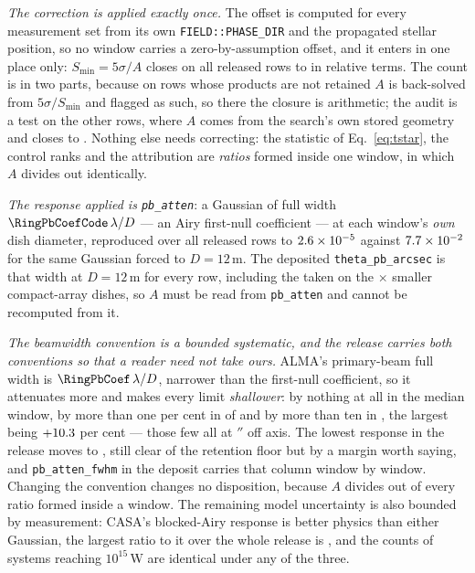 \emph{The correction is applied exactly once.} The offset is computed for
every measurement set from its own \texttt{FIELD::PHASE\_DIR} and the
propagated stellar position, so no window carries a zero-by-assumption
offset, and it enters in one place only: $S_{\min}=5\sigma/A$ closes on all
\PbSminClosed{} released rows to \PbSminWorstRes{} in relative terms. The
count is in two parts, because on \PbSminTaut{} rows whose products are not
retained $A$ is back-solved from $5\sigma/S_{\min}$ and flagged as such, so
there the closure is arithmetic; the audit is a test on the other
\PbSminIndep{} rows, where $A$ comes from the search's own stored geometry and
closes to \PbSminIndepRes. Nothing else needs correcting: the statistic of
Eq.~\ref{eq:tstar}, the control ranks and the attribution are \emph{ratios}
formed inside one window, in which $A$ divides out identically.

\emph{The response applied is \texttt{pb\_atten}}: a Gaussian of full width
$\RingPbCoefCode\,\lambda/D$ --- an Airy first-null coefficient --- at each
window's \emph{own} dish diameter, reproduced over all \NWindows{} released
rows to $2.6\times10^{-5}$ against $7.7\times10^{-2}$ for the same Gaussian
forced to $D=12$\,m. The deposited \texttt{theta\_pb\_arcsec} is that width
at $D=12$\,m for every row, including the \PbNAcaRow{} taken on the
\PbAcaRatio$\times$ smaller compact-array dishes, so $A$ must be read from
\texttt{pb\_atten} and cannot be recomputed from it.

\emph{The beamwidth convention is a bounded systematic, and the release
carries both conventions so that a reader need not take ours.} ALMA's
primary-beam full width is $\RingPbCoef\,\lambda/D$, narrower than the
first-null coefficient, so it attenuates more and makes every limit
\emph{shallower}: by nothing at all in the median window, by more than one
per cent in \SensPbNOnePct{} of \NWindows{} and by more than ten in
\SensPbNTenPct, the largest being $+10.3$ per cent --- those
few all \SensPbWorstStar{} at \SensPbWorstOff$''$ off axis. The lowest
response in the release moves \SensPbAMin{} to \SensPbAMinAlma, still clear
of the \SensPbFloor{} retention floor but by a margin worth saying, and
\texttt{pb\_atten\_fwhm} in the deposit carries that column window by window.
Changing the convention changes no disposition, because $A$ divides out of
every ratio formed inside a window. The
remaining model uncertainty is also bounded by measurement: CASA's
blocked-Airy response is better physics than either Gaussian, the largest
ratio to it over the whole release is \PbModelMax, and the counts of systems
reaching $10^{15}$\,W are identical under any of the three.

